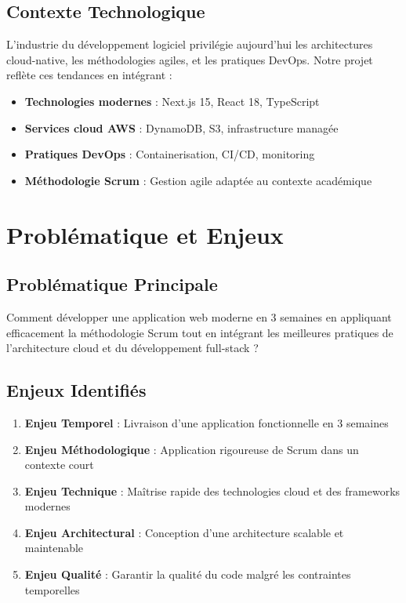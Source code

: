 \subsection{Contexte Technologique}

L'industrie du développement logiciel privilégie aujourd'hui les architectures cloud-native, les méthodologies agiles, et les pratiques DevOps. Notre projet reflète ces tendances en intégrant :

\begin{itemize}
    \item \textbf{Technologies modernes} : Next.js 15, React 18, TypeScript
    \item \textbf{Services cloud AWS} : DynamoDB, S3, infrastructure managée
    \item \textbf{Pratiques DevOps} : Containerisation, CI/CD, monitoring
    \item \textbf{Méthodologie Scrum} : Gestion agile adaptée au contexte académique
\end{itemize}

\section{Problématique et Enjeux}

\subsection{Problématique Principale}

Comment développer une application web moderne en 3 semaines en appliquant efficacement la méthodologie Scrum tout en intégrant les meilleures pratiques de l'architecture cloud et du développement full-stack ?

\subsection{Enjeux Identifiés}

\begin{enumerate}
    \item \textbf{Enjeu Temporel} : Livraison d'une application fonctionnelle en 3 semaines
    \item \textbf{Enjeu Méthodologique} : Application rigoureuse de Scrum dans un contexte court
    \item \textbf{Enjeu Technique} : Maîtrise rapide des technologies cloud et des frameworks modernes
    \item \textbf{Enjeu Architectural} : Conception d'une architecture scalable et maintenable
    \item \textbf{Enjeu Qualité} : Garantir la qualité du code malgré les contraintes temporelles
\end{enumerate}


